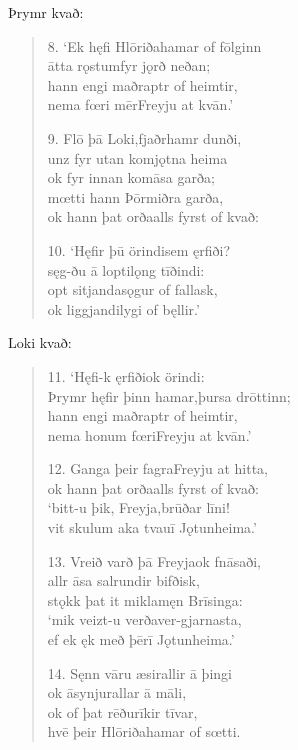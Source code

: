 \documentclass[12pt,letterpaper]{book}
\newcommand{\gap}[1][.25in]{\hspace{#1}}
\begin{document}
\begin{linenumbers}
\noindent Þrymr kvað:

\begin{verse}
8. `Ek hęfi Hlōriða\gap hamar of fōlginn\\
ātta rǫstum\gap fyr jǫrð neðan;\\
hann engi maðr\gap aptr of heimtir,\\
nema fœri mēr\gap Freyju at kvān.'

9. Flō þā Loki,\gap fjaðrhamr dunði,\\
unz fyr utan kom\gap jǫtna heima\\
ok fyr innan kom\gap āsa garða;\\
mœtti hann Þōr\gap miðra garða,\\
ok hann þat orða\gap alls fyrst of kvað:

10. `Hęfir þū örindi\gap sem ęrfiði?\\
sęg-ðu ā lopti\gap lǫng tīðindi:\\
opt sitjanda\gap sǫgur of fallask,\\
ok liggjandi\gap lygi of bęllir.'
\end{verse}

\noindent Loki kvað:

\begin{verse}
11. `Hęfi-k ęrfiði\gap ok örindi:\\
Þrymr hęfir þinn hamar,\gap þursa drōttinn;\\
hann engi maðr\gap aptr of heimtir,\\
nema honum fœri\gap Freyju at kvān.'

12. Ganga þeir fagra\gap Freyju at hitta,\\
ok hann þat orða\gap alls fyrst of kvað:\\
`bitt-u þik, Freyja,\gap brūðar līni!\\
vit skulum aka tvau\gap ī Jǫtunheima.'

13. Vreið varð þā Freyja\gap ok fnāsaði,\\
allr āsa salr\gap undir bifðisk,\\
stǫkk þat it mikla\gap męn Brīsinga:\\
`mik veizt-u verða\gap ver-gjarnasta,\\
ef ek ęk með þēr\gap ī Jǫtunheima.'

14. Sęnn vāru æsir\gap allir ā þingi\\
ok āsynjur\gap allar ā māli,\\
ok of þat rēðu\gap rīkir tīvar,\\
hvē þeir Hlōriða\gap hamar of sœtti.


\end{verse}
\end{linenumbers}
\end{document}
